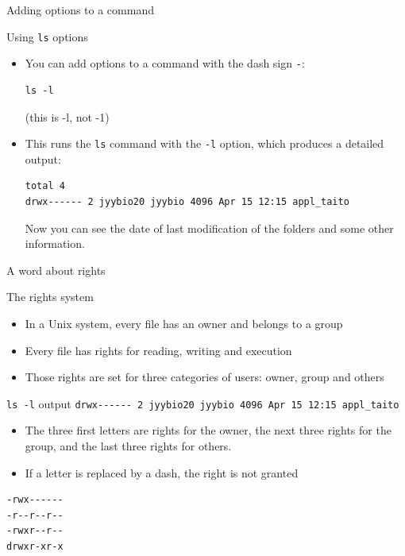 \documentclass[big]{beamer}
\begin{document}
\begin{frame}[fragile,label=sec-2-11]{Adding options to a command}
 \begin{block}{Using \texttt{ls} options}
\begin{itemize}
\item You can add options to a command with the dash sign \texttt{-}:
\begin{verbatim}
ls -l
\end{verbatim}
(this is -l, not -1)

\item This runs the \texttt{ls} command with the \texttt{-l} option, which produces a detailed
output:
\begin{verbatim}
total 4
drwx------ 2 jyybio20 jyybio 4096 Apr 15 12:15 appl_taito
\end{verbatim}
Now you can see the date of last modification of the folders and some other
information.
\end{itemize}
\end{block}
\end{frame}
\begin{frame}[fragile,label=sec-2-12]{A word about rights}
 \begin{block}{The rights system}
\begin{itemize}
\item In a Unix system, every file has an \alert{owner} and belongs to a \alert{group}
\item Every file has rights for \alert{reading}, \alert{writing} and \alert{execution}
\item Those rights are set for three categories of users: \alert{owner}, \alert{group} and
  \alert{others}
\end{itemize}
\end{block}
\begin{block}{\texttt{ls -l} output}
\texttt{drwx-{}-{}-{}-{}-{}- 2 jyybio20 jyybio 4096 Apr 15 12:15 appl\_taito}
\begin{itemize}
\item The three first letters are rights for the owner, the next three rights for
the group, and the last three rights for others.
\item If a letter is replaced by a dash, the right is not granted
\end{itemize}
\begin{verbatim}
-rwx------
-r--r--r--
-rwxr--r--
drwxr-xr-x
\end{verbatim}
\end{block}
\end{frame}
\end{document}

